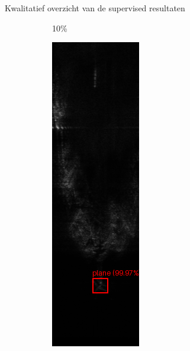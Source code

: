 \documentclass[aspectratio=169]{beamer}
\begin{document}
\begin{frame}{Kwalitatief overzicht van de supervised resultaten}
\begin{figure}
\begin{subfigure}{.15\textwidth}
                \caption[Voorspelling Faster R-CNN 10\%]{10\%}
            \end{subfigure}%
            \hfill
            \begin{subfigure}{.15\textwidth}
                \centering
                \captionsetup{justification=centering}
                \includegraphics[width=0.9\linewidth]{251_faster_rcnn_50pct.png}

\end{subfigure}
\end{figure}
\end{frame}
\end{document}
